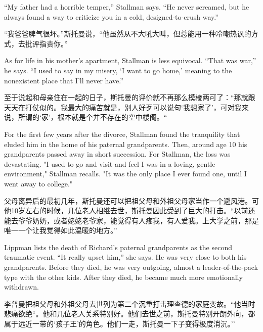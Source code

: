 \ifdefined\eng
``My father had a horrible temper,'' Stallman says. ``He never screamed, but he always found a way to criticize you in a cold, designed-to-crush way.''
\fi

\ifdefined\chs
``我爸爸脾气很坏。''斯托曼说，``他虽然从不大吼大叫，但总能用一种冷嘲热讽的方式，去批评指责你。''
\fi

\ifdefined\eng
As for life in his mother's apartment, Stallman is less equivocal. ``That was war,'' he says. ``I used to say in my misery, `I want to go home,' meaning to the nonexistent place that I'll never have.''
\fi

\ifdefined\chs
至于说起和母亲住在一起的日子，斯托曼的评价就不再那么模棱两可了：``那就跟天天在打仗似的。我最大的痛苦就是，别人好歹可以说句`我想家了'，可对我来说，所谓的`家'，根本就是个并不存在的空中楼阁。``
\fi

\ifdefined\eng
For the first few years after the divorce, Stallman found the tranquility that eluded him in the home of his paternal grandparents. Then, around age 10 his grandparents passed away in short succession. For Stallman, the loss was devastating. "I used to go and visit and feel I was in a loving, gentle environment," Stallman recalls. "It was the only place I ever found one, until I went away to college."
\fi

\ifdefined\chs
父母离异后的最初几年，斯托曼还可以把祖父母和外祖父母家当作一个避风港。可他10岁左右的时候，几位老人相继去世，斯托曼因此受到了巨大的打击。``以前还能去爷爷奶奶，或者姥姥老爷家，能觉得有人疼我，有人爱我。上大学之前，那是唯一一个让我觉得如此温暖的地方。''
\fi

\ifdefined\eng
Lippman lists the death of Richard's paternal grandparents as the second traumatic event. ``It really upset him,'' she says. He was very close to both his grandparents. Before they died, he was very outgoing, almost a leader-of-the-pack type with the other kids. After they died, he became much more emotionally withdrawn.
\fi

\ifdefined\chs
李普曼把祖父母和外祖父母去世列为第二个沉重打击理查德的家庭变故。``他当时悲痛欲绝``。他和几位老人关系特别好。他们去世之前，斯托曼特别开朗外向，都属于远近一带的`孩子王'的角色。他们一走，斯托曼一下子变得极度消沉。''
\fi

